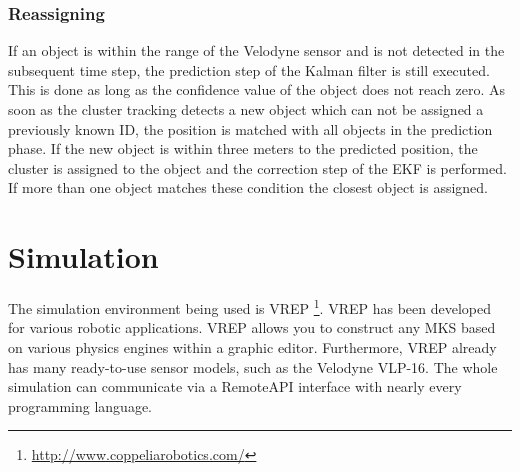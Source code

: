 \documentclass[11pt,oneside,openright]{mpreport}
\begin{document}
\subsection{Reassigning}

If an object is within the range of the Velodyne sensor and is not detected in the subsequent time step, the prediction step of the Kalman filter is still executed.
This is done as long as the confidence value of the object does not reach zero. As soon as the cluster tracking detects a new object which can not be assigned a previously known ID,
the position is matched with all objects in the prediction phase. If the new object is within three meters to the predicted position, the cluster is assigned to the object
and the correction step of the EKF is performed. If more than one object matches these condition the closest object is assigned.

\chapter{Simulation}

The simulation environment being used is VREP \footnote{\url{http://www.coppeliarobotics.com/}}. VREP has been developed for various robotic applications.
VREP allows you to construct any \ac{MKS} based on various physics engines within a graphic editor. Furthermore, VREP already has many ready-to-use sensor models, such as
the Velodyne VLP-16. The whole simulation can communicate via a RemoteAPI interface with nearly every programming language.
\end{document}
